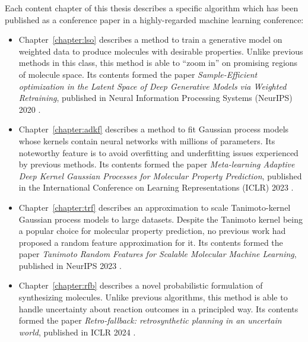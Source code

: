 Each content chapter of this thesis describes a specific algorithm which has been
published as a conference paper in a highly-regarded machine learning conference:
\begin{itemize}
    \item Chapter~\ref{chapter:lso}
        describes a method to train a generative model on weighted data
        to produce molecules with desirable properties.
        Unlike previous methods in this class,
        this method is able to ``zoom in'' on promising regions of molecule space.
        Its contents formed the paper
        \emph{Sample-Efficient optimization in the Latent Space of Deep Generative Models via Weighted Retraining},
        published in Neural Information Processing Systems (NeurIPS) 2020
        \citep{tripp2020sample}.
    \item Chapter~\ref{chapter:adkf}
        describes a method to fit Gaussian process models whose kernels contain neural networks with millions of parameters.
        Its noteworthy feature is to avoid overfitting and underfitting issues experienced by previous methods.
        Its contents formed the paper
        \emph{Meta-learning Adaptive Deep Kernel Gaussian Processes for Molecular Property Prediction},
        published in the International Conference on Learning Representations (ICLR) 2023
        \citep{chen2022meta}.
    \item Chapter~\ref{chapter:trf}
        describes an approximation to scale Tanimoto-kernel Gaussian process models to large datasets.
        Despite the Tanimoto kernel being a popular choice for molecular property prediction,
        no previous work had proposed a random feature approximation for it.
        Its contents formed the paper
        \emph{Tanimoto Random Features for Scalable Molecular Machine Learning},
        published in NeurIPS 2023
        \citep{tripp2023tanimoto}.
    \item Chapter~\ref{chapter:rfb}
        describes a novel probabilistic formulation of synthesizing molecules.
        Unlike previous algorithms, this method is able to handle uncertainty
        about reaction outcomes in a principled way.
        Its contents formed the paper
        \emph{Retro-fallback: retrosynthetic planning in an uncertain world},
        published in ICLR 2024 \citep{tripp2023retrofallback}.
\end{itemize}

